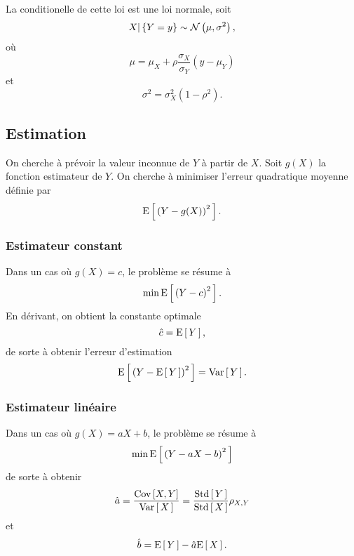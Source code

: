\documentclass[11pt]{article}
\newcommand\Norm[2]{%
	\ensuremath{%
		\mathcal{N}\left(#1,#2\right)%
	}%
}%
\newcommand\Esp[1]{%
	\ensuremath{%
		\mathrm{E}\left[\,#1\,\right]%
	}%
}%
\newcommand\Var[1]{%
	\ensuremath{%
		\mathrm{Var}\left[\,#1\,\right]%
	}%
}%
\newcommand\Std[1]{%
	\ensuremath{%
		\mathrm{Std}\left[\,#1\,\right]%
	}%
}%
\newcommand\Cov[2]{%
	\ensuremath{%
		\mathrm{Cov}\left[#1,#2\right]%
	}%
}%
\newcommand\Min{
	\ensuremath{%
		\mathrm{min}\,%
	}%
}
\begin{document}
La conditionelle de cette loi est une loi normale, soit
\begin{equation*}
	X|\left\{Y=y\right\}\sim\Norm{\mu}{\sigma^2},
\end{equation*}
où
\begin{equation*}
	\mu=\mu_X+\rho\frac{\sigma_X}{\sigma_Y}(y-\mu_Y)
\end{equation*}
et
\begin{equation*}
	\sigma^2=\sigma_X^2(1-\rho^2).
\end{equation*}

\subsection{Estimation}
On cherche à prévoir la valeur inconnue de $Y$ à partir de $X$. Soit $g(X)$ la
fonction estimateur de $Y$. On cherche à minimiser l'erreur quadratique moyenne
définie par
\begin{equation*}
	\Esp{\left(Y-g(X)\right)^2}.
\end{equation*}

\subsubsection{Estimateur constant}
Dans un cas où $g(X)=c$, le problème se résume à
\begin{equation*}
	\Min\Esp{\left(Y-c\right)^2}.
\end{equation*}
En dérivant, on obtient la constante optimale
\begin{equation*}
	\hat{c}=\Esp{Y},
\end{equation*}
de sorte à obtenir l'erreur d'estimation
\begin{equation*}
	\Esp{\left(Y-\Esp{Y}\right)^2}=\Var{Y}.
\end{equation*}

\subsubsection{Estimateur linéaire}
Dans un cas où $g(X)=aX+b$, le problème se résume à
\begin{equation*}
	\Min\Esp{\left(Y-aX-b\right)^2}
\end{equation*}
de sorte à obtenir
\begin{equation*}
	\hat{a}=\frac{\Cov{X}{Y}}{\Var{X}}=\frac{\Std{Y}}{\Std{X}}\rho_{X,Y}
\end{equation*}
et
\begin{equation*}
	\hat{b}=\Esp{Y}-\hat{a}\Esp{X}.
\end{equation*}
\end{document}

